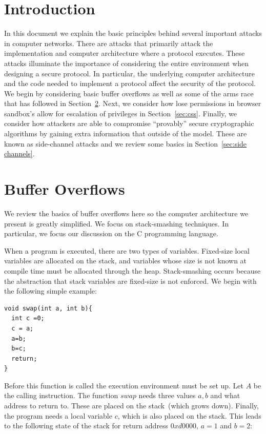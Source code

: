 \documentclass{article}
\begin{document}
\section{Introduction}
In this document we explain the basic principles behind several important attacks in computer networks.  There are attacks that primarily attack the implementation and computer architecture where a protocol executes.  These attacks illuminate the importance of considering the entire environment when designing a secure protocol.  In particular, the underlying computer architecture and the code needed to implement a protocol affect the security of the protocol.  We begin by considering basic buffer overflows as well as some of the arms race that has followed in Section~\ref{sec:buffer overflows}.  Next, we consider how lose permissions in browser sandbox's allow for escalation of privileges in Section~\ref{sec:css}.  Finally, we consider how attackers are able to compromise ``provably'' secure cryptographic algorithms by gaining extra information that outside of the model.  These are known as side-channel attacks and we review some basics in Section~\ref{sec:side channels}.

\section{Buffer Overflows}\label{sec:buffer overflows}
We review the basics of buffer overflows here so the computer architecture we present is greatly simplified.  We focus on stack-smashing techniques.  In particular, we focus our discussion on the C programming language.

When a program is executed, there are two types of variables.  Fixed-size local variables are allocated on the stack, and variables whose size is not known at compile time must be allocated through the heap.  Stack-smashing occurs because the abstraction that stack variables are fixed-size is not enforced.  We begin with the following simple example:

\begin{lstlisting}
void swap(int a, int b){
  int c =0;
  c = a;
  a=b;
  b=c;
  return;
}
\end{lstlisting}

Before this function is called the execution environment must be set up.  Let $A$ be the calling instruction.  The function $swap$ needs three values $a, b$ and what address to return to.  These are placed on the stack~(which grows down).  Finally, the program needs a local variable $c$, which is also placed on the stack.  This leads to the following state of the stack for return address $0xd0000$, $a=1$ and $b=2$:
\end{document}
